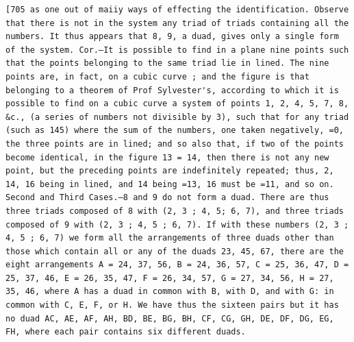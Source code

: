 \documentclass[12pt]{article}
\theoremstyle{plain}
\begin{document}
\newpage
\setcounter{page}{572}
\begin{verbatim}
[705 as one out of maiiy ways of effecting the identification. Observe that there is not in the system any triad of triads containing all the numbers. It thus appears that 8, 9, a duad, gives only a single form of the system. Cor.—It is possible to find in a plane nine points such that the points belonging to the same triad lie in lined. The nine points are, in fact, on a cubic curve ; and the figure is that belonging to a theorem of Prof Sylvester's, according to which it is possible to find on a cubic curve a system of points 1, 2, 4, 5, 7, 8, &c., (a series of numbers not divisible by 3), such that for any triad (such as 145) where the sum of the numbers, one taken negatively, =0, the three points are in lined; and so also that, if two of the points become identical, in the figure 13 = 14, then there is not any new point, but the preceding points are indefinitely repeated; thus, 2, 14, 16 being in lined, and 14 being =13, 16 must be =11, and so on. Second and Third Cases.—8 and 9 do not form a duad. There are thus three triads composed of 8 with (2, 3 ; 4, 5; 6, 7), and three triads composed of 9 with (2, 3 ; 4, 5 ; 6, 7). If with these numbers (2, 3 ; 4, 5 ; 6, 7) we form all the arrangements of three duads other than those which contain all or any of the duads 23, 45, 67, there are the eight arrangements A = 24, 37, 56, B = 24, 36, 57, C = 25, 36, 47, D = 25, 37, 46, E = 26, 35, 47, F = 26, 34, 57, G = 27, 34, 56, H = 27, 35, 46, where A has a duad in common with B, with D, and with G: in common with C, E, F, or H. We have thus the sixteen pairs but it has no duad AC, AE, AF, AH, BD, BE, BG, BH, CF, CG, GH, DE, DF, DG, EG, FH, where each pair contains six different duads. 
\end{verbatim}
\end{document}
